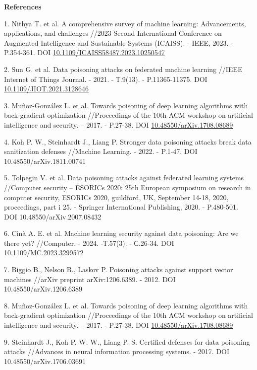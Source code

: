 \begin{center}
{\bfseries References}
\end{center}

\begin{references}
1. Nithya T. et al. A comprehensive survey of machine learning:
Advancements, applications, and challenges //2023 Second International
Conference on Augmented Intelligence and Sustainable Systems (ICAISS). -
IEEE, 2023. - P.354-361. DOI
\href{http://dx.doi.org/10.1109/ICAISS58487.2023.10250547}{10.1109/ICAISS58487.2023.10250547}

2. Sun G. et al. Data poisoning attacks on federated machine learning
//IEEE Internet of Things Journal. - 2021. - Т.9(13). - P.11365-11375.
DOI
\href{http://dx.doi.org/10.1109/JIOT.2021.3128646}{10.1109/JIOT.2021.3128646}

3. Muñoz-González L. et al. Towards poisoning of deep learning algorithms
with back-gradient optimization //Proceedings of the 10th ACM workshop
on artificial intelligence and security. -- 2017. - P.27-38. DOI
\href{http://dx.doi.org/10.48550/arXiv.1708.08689}{10.48550/arXiv.1708.08689}

4. Koh P. W., Steinhardt J., Liang P. Stronger data poisoning attacks
break data sanitization defenses //Machine Learning. - 2022. - P.1-47.
DOI 10.48550/arXiv.1811.00741

5. Tolpegin V. et al. Data poisoning attacks against federated learning
systems //Computer security -- ESORICs 2020: 25th European symposium on
research in computer security, ESORICs 2020, guildford, UK, September
14-18, 2020, proceedings, part i 25. - Springer International
Publishing, 2020. - P.480-501. DOI 10.48550/arXiv.2007.08432

6. Cinà A. E. et al. Machine learning security against data poisoning:
Are we there yet? //Computer. - 2024. -Т.57(3). - С.26-34. DOI
10.1109/MC.2023.3299572

7. Biggio B., Nelson B., Laskov P. Poisoning attacks against support
vector machines //arXiv preprint arXiv:1206.6389. - 2012. DOI
10.48550/arXiv.1206.6389

8. Muñoz-González L. et al. Towards poisoning of deep learning algorithms
with back-gradient optimization //Proceedings of the 10th ACM workshop
on artificial intelligence and security. -- 2017. - P.27-38. DOI
\href{http://dx.doi.org/10.48550/arXiv.1708.08689}{10.48550/arXiv.1708.08689}

9. Steinhardt J., Koh P. W. W., Liang P. S. Certified defenses for data
poisoning attacks //Advances in neural information processing systems. -
2017. DOI 10.48550/arXiv.1706.03691


\end{references}
